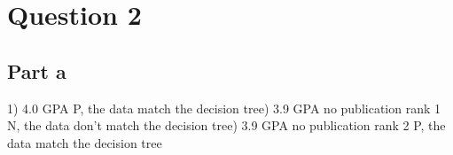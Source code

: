 \documentclass[12pt]{article}
\begin{document}
\section*{Question 2}

\subsection*{Part a}

1) 4.0 GPA  P, the data match the decision tree) 3.9 GPA  no publication  rank 1  N, the data don't match the decision tree) 3.9 GPA  no publication  rank 2  P, the data match the decision tree\n
\end{document}
